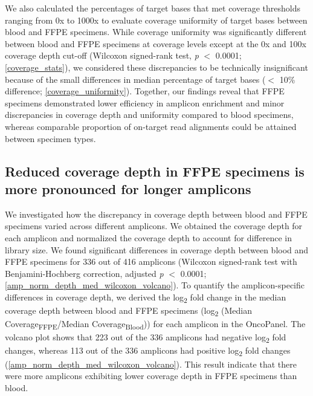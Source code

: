 \documentclass{bmcart}
\begin{document}
We also calculated the percentages of target bases that met coverage thresholds ranging from 0x to 1000x to evaluate coverage uniformity of target bases between blood and FFPE specimens. While coverage uniformity was significantly different between blood and FFPE specimens at coverage levels except at the 0x and 100x coverage depth cut-off (Wilcoxon signed-rank test, \textit{p} $<$ \num{0.0001}; \autoref{coverage_stats}), we considered these discrepancies to be technically insignificant because of the small differences in median percentage of target bases ($<$ 10\% difference; \autoref{coverage_uniformity}). Together, our findings reveal that FFPE specimens demonstrated lower efficiency in amplicon enrichment and minor discrepancies in coverage depth and uniformity compared to blood specimens, whereas comparable proportion of on-target read alignments could be attained between specimen types.

\subsection*{Reduced coverage depth in FFPE specimens is more pronounced for longer amplicons}

We investigated how the discrepancy in coverage depth between blood and FFPE specimens varied across different amplicons. We obtained the coverage depth for each amplicon and normalized the coverage depth to account for difference in library size. We found significant differences in coverage depth between blood and FFPE specimens for 336 out of 416 amplicons (Wilcoxon signed-rank test with Benjamini-Hochberg correction, adjusted \textit{p} $<$ 0.0001; \autoref{amp_norm_depth_med_wilcoxon_volcano}). To quantify the amplicon-specific differences in coverage depth, we derived the log\textsubscript{2} fold change in the median coverage depth between blood and FFPE specimens (log\textsubscript{2} (Median Coverage\textsubscript{FFPE}/Median Coverage\textsubscript{Blood})) for each amplicon in the OncoPanel. The volcano plot shows that 223 out of the 336 amplicons had negative log\textsubscript{2} fold changes, whereas 113 out of the 336 amplicons had positive log\textsubscript{2} fold changes (\autoref{amp_norm_depth_med_wilcoxon_volcano}). This result indicate that there were more amplicons exhibiting lower coverage depth in FFPE specimens than blood.
\end{document}
